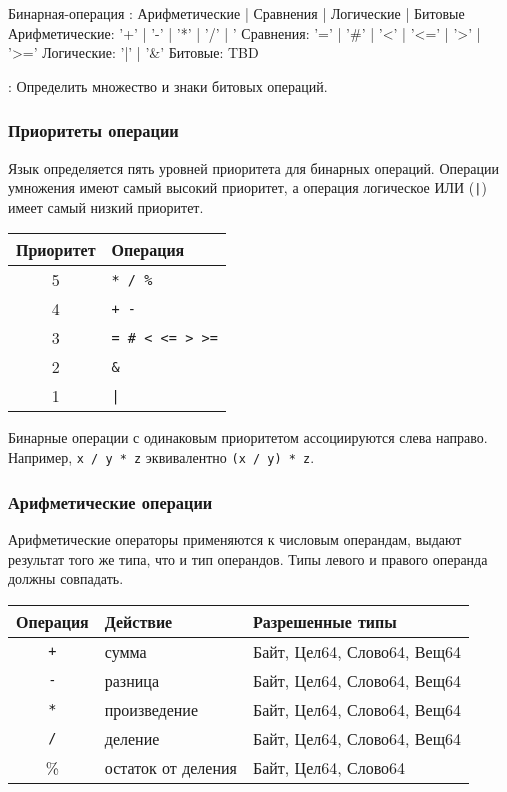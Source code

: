 \begin{Grammar}
Бинарная-операция
    : Арифметические
    | Сравнения
    | Логические
    | Битовые
Арифметические: '+' | '-' | '*' | '/' | '%
Сравнения: '=' | '#' | '<' | '<=' | '>' | '>='
Логические: '|' | '&' 
Битовые: TBD
\end{Grammar} 

\TBD: Определить множество и знаки битовых операций.

\hypertarget{ops-precedence}{%
\subsubsection{Приоритеты операции}\label{expr:ops-precedence}}

Язык определяется пять уровней приоритета для бинарных операций. Операции умножения имеют самый высокий приоритет, а операция логическое ИЛИ (\verb+|+) имеет самый низкий приоритет.

\begin{tabular}[c]{c|l}
\textbf{Приоритет} & \textbf{Операция} \\ 
\hline
5 &   \verb#* / %# \\
4 &   \verb#+ -# \\
3 &   \verb|= # < <= > >=| \\
2 &   \verb#&# \\
1 &  \verb#|# \\
\hline
\end{tabular}

\bigskip
Бинарные операции с одинаковым приоритетом ассоциируются слева направо. Например, \verb|x / y * z| эквивалентно \verb|(x / y) * z|.

\hypertarget{ops-arithmetic}{%
\subsubsection{Арифметические операции}\label{expr:ops-arithmetic}}

Арифметические операторы применяются к числовым операндам, выдают результат того же типа, что и тип операндов.
Типы левого и правого операнда должны совпадать. 

\bigskip
\begin{tabular}[c]{c|l|l}
\textbf{Операция} & \textbf{Действие} & \textbf{Разрешенные типы} \\ 
\hline
\verb|+| & сумма & Байт, Цел64, Слово64, Вещ64 \\
\verb|-| &  разница & Байт, Цел64, Слово64, Вещ64 \\
\verb|*| & произведение & Байт, Цел64, Слово64, Вещ64 \\
\verb|/| &  деление & Байт, Цел64, Слово64, Вещ64\\
\% & остаток от деления  &  Байт, Цел64, Слово64 \\
\hline
\end{tabular}


